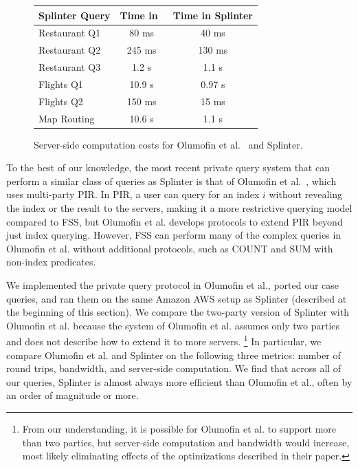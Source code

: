 
\begin{figure}
	\centering
	\begin{tabular}{lcc}
		\toprule
		\bf Splinter Query & \bf Time in~\cite{goldberg} & \bf Time in Splinter \\
		\midrule
		Restaurant Q1 & 80 ms & 40 ms \\
		\midrule
		Restaurant Q2 & 245 ms & 130 ms \\ 
		\midrule
		Restaurant Q3 & 1.2 s & 1.1 s \\
		\midrule
		Flights Q1 & 10.9 s & 0.97 s \\
		\midrule
		Flights Q2 & 150 ms & 15 ms \\
		\midrule
		Map Routing & 10.6 s & 1.1 s \\
		\bottomrule
	\end{tabular}
	\caption{Server-side computation costs for Olumofin et al.~\cite{goldberg} and Splinter.}
	\label{fig:serverside-comparison}
\end{figure}

To the best of our knowledge, the most recent
private query system that can perform a similar class of queries
as Splinter is that of Olumofin et al.~\cite{goldberg},
which uses multi-party PIR. In PIR, a user can query for an index $i$
without revealing the index or the result to the servers, making 
it a more restrictive querying model compared to FSS, but Olumofin et al.
develops protocols to extend PIR beyond just index querying. However,
FSS can perform many of the complex queries in Olumofin et al.
without additional protocols, such as COUNT and SUM 
with non-index predicates.

We implemented the private query protocol in Olumofin et al., ported our
case queries, and ran them on the same Amazon AWS setup as Splinter
(described at the beginning of this section).
We compare the two-party version of Splinter with Olumofin et al.
because the system of Olumofin et al. assumes only two parties 
and does not describe how to extend it to more servers.
\footnote{From our understanding, it is possible for Olumofin et al. to support
	more than two parties, but server-side computation and bandwidth would increase, 
	most likely eliminating effects of the optimizations described in their paper.}
In particular, we compare Olumofin et al. and Splinter on
the following three metrics: number of  
round trips, bandwidth, and server-side computation. We find
that across all of our queries, Splinter is almost always 
more efficient than Olumofin et al., often by an order of 
magnitude or more.

